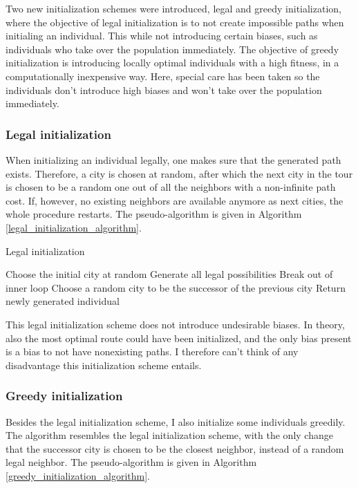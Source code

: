 \documentclass[a4paper,10pt]{article}
\begin{document}
Two new initialization schemes were introduced, legal and greedy initialization, where the objective of legal initialization is to not create impossible paths when initialing an individual. This while not introducing certain biases, such as individuals who take over the population immediately. The objective of greedy initialization is introducing locally optimal individuals with a high fitness, in a computationally inexpensive way. Here, special care has been taken so the individuals don't introduce high biases and won't take over the population immediately.

\subsubsection{Legal initialization}
When initializing an individual legally, one makes sure that the generated path exists. Therefore, a city is chosen at random, after which the next city in the tour is chosen to be a random one out of all the neighbors with a non-infinite path cost. If, however, no existing neighbors are available anymore as next cities, the whole procedure restarts. The pseudo-algorithm is given in Algorithm \ref{legal_initialization_algorithm}.

\begin{algorithm}
\caption{Legal initialization}\label{legal_initialization_algorithm}
\begin{algorithmic}
\State Choose the initial city at random
\State Generate all legal possibilities
\State Break out of inner loop
\EndIf
\State Choose a random city to be the successor of the previous city
\EndWhile
{}
\State Return newly generated individual
\EndIf
\EndWhile
\end{algorithmic}
\end{algorithm}

This legal initialization scheme does not introduce undesirable biases. In theory, also the most optimal route could have been initialized, and the only bias present is a bias to not have nonexisting paths. I therefore can't think of any disadvantage this initialization scheme entails. 

\subsubsection{Greedy initialization}
\label{greedy_initialization}
Besides the legal initialization scheme, I also initialize some individuals greedily. The algorithm resembles the legal initialization scheme, with the only change that the successor city is chosen to be the closest neighbor, instead of a random legal neighbor. The pseudo-algorithm is given in Algorithm \ref{greedy_initialization_algorithm}.
\end{document}
